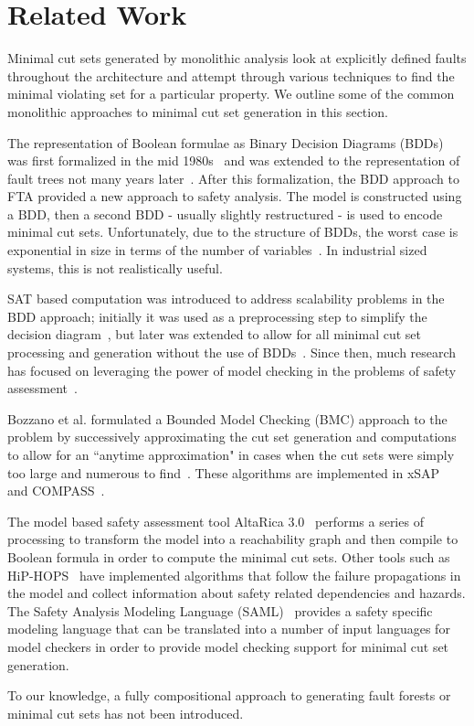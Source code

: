 \section{Related Work}
\label{sec:related_work}
Minimal cut sets generated by monolithic analysis look at explicitly defined faults throughout the architecture and attempt through various techniques to find the minimal violating set for a particular property. We outline some of the common monolithic approaches to minimal cut set generation in this section.

The representation of Boolean formulae as Binary Decision Diagrams (BDDs) was first formalized in the mid 1980s~\cite{bryant1986graph} and was extended to the representation of fault trees not many years later~\cite{rauzy1993new}. After this formalization, the BDD approach to FTA provided a new approach to safety analysis. The model is constructed using a BDD, then a second BDD - usually slightly restructured - is used to encode minimal cut sets. Unfortunately, due to the structure of BDDs, the worst case is exponential in size in terms of the number of variables~\cite{bryant1986graph,rauzy1993new}. In industrial sized systems, this is not realistically useful. 

SAT based computation was introduced to address scalability problems in the BDD approach; initially it was used as a preprocessing step to simplify the decision diagram~\cite{bozzano2015safety}, but later was extended to allow for all minimal cut set processing and generation without the use of BDDs~\cite{bozzano2015efficient}. Since then, much research has focused on leveraging the power of model checking in the problems of safety assessment~\cite{bieber2002combination,schafer2003combining,bozzano2003improving,volk2017fast,bozzano2015efficient,stewart2020safety}. 

Bozzano et al. formulated a Bounded Model Checking (BMC) approach to the problem by successively approximating the cut set generation and computations to allow for an ``anytime approximation" in cases when the cut sets were simply too large and numerous to find~\cite{bozzano2015efficient}. These algorithms are implemented in xSAP~\cite{DBLP:conf/tacas/BittnerBCCGGMMZ16} and COMPASS~\cite{compass30toolset}. 

The model based safety assessment tool AltaRica 3.0~\cite{prosvirnova:tel-01119730} performs a series of processing to transform the model into a reachability graph and then compile to Boolean formula in order to compute the minimal cut sets. Other tools such as HiP-HOPS~\cite{papadopoulos2001model} have implemented algorithms that follow the failure propagations in the model and collect information about safety related dependencies and hazards. The Safety Analysis Modeling Language (SAML)~\cite{Gudemann:2010:FQQ:1909626.1909813} provides a safety specific modeling language that can be translated into a number of input languages for model checkers in order to provide model checking support for minimal cut set generation.

To our knowledge, a fully compositional approach to generating fault forests or minimal cut sets has not been introduced.




















